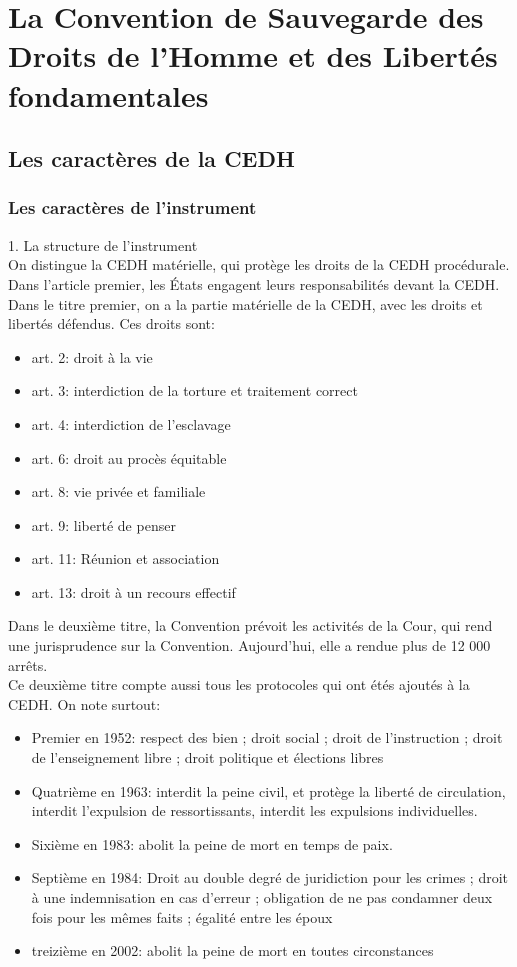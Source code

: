 \documentclass[10pt, a4paper, openany]{book}
\begin{document}
\section{La Convention de Sauvegarde des Droits de l'Homme et des Libertés fondamentales}

\subsection{Les caractères de la CEDH}

\subsubsection{Les caractères de l'instrument}

1. La structure de l'instrument \\
On distingue la CEDH matérielle, qui protège les droits de la CEDH procédurale. Dans l'article premier, les États engagent leurs responsabilités devant la CEDH. \\
Dans le titre premier, on a la partie matérielle de la CEDH, avec les droits et libertés défendus. Ces droits sont: 
\begin{itemize}
\item art. 2: droit à la vie
\item art. 3: interdiction de la torture et traitement correct
\item art. 4: interdiction de l'esclavage
\item art. 6: droit au procès équitable
\item art. 8: vie privée et familiale
\item art. 9: liberté de penser
\item art. 11: Réunion et association
\item art. 13: droit à un recours effectif
\end{itemize}


Dans le deuxième titre, la Convention prévoit les activités de la Cour, qui rend une jurisprudence sur la Convention. Aujourd'hui, elle a rendue plus de 12 000 arrêts. \\
Ce deuxième titre compte aussi tous les protocoles qui ont étés ajoutés à la CEDH. On note surtout: \\
\begin{itemize}
\item Premier en 1952: respect des bien ; droit social ; droit de l'instruction ; droit de l'enseignement libre ; droit politique et élections libres
\item Quatrième en 1963: interdit la peine civil, et protège la liberté de circulation, interdit l'expulsion de ressortissants, interdit les expulsions individuelles. 
\item Sixième en 1983: abolit la peine de mort en temps de paix. 
\item Septième en 1984: Droit au double degré de juridiction pour les crimes ; droit à une indemnisation en cas d'erreur ; obligation de ne pas condamner deux fois pour les mêmes faits ; égalité entre les époux
\item treizième en 2002: abolit la peine de mort en toutes circonstances
\end{itemize}
\end{document}
